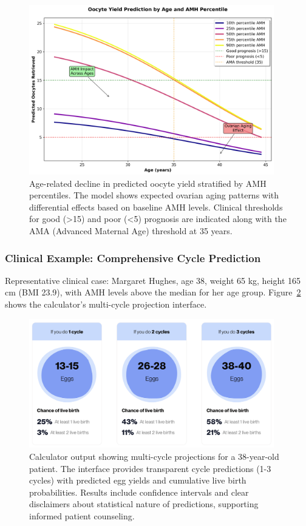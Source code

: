 \begin{figure}[H]
    \centering
    \includegraphics[width=0.95\textwidth]{figures/calculator_age_oocytes.png}
    \caption{Age-related decline in predicted oocyte yield stratified by AMH percentiles. The model shows expected ovarian aging patterns with differential effects based on baseline AMH levels. Clinical thresholds for good (>15) and poor (<5) prognosis are indicated along with the AMA (Advanced Maternal Age) threshold at 35 years.}
    \label{fig:calculator_age}
\end{figure}

\subsubsection{Clinical Example: Comprehensive Cycle Prediction}

Representative clinical case: Margaret Hughes, age 38, weight 65 kg, height 165 cm (BMI 23.9), with AMH levels above the median for her age group. Figure~\ref{fig:oocyte_prediction} shows the calculator's multi-cycle projection interface.

\begin{figure}[H]
    \centering
    \includegraphics[width=0.95\textwidth]{figures/OocytePrediction.png}
    \caption{Calculator output showing multi-cycle projections for a 38-year-old patient. The interface provides transparent cycle predictions (1-3 cycles) with predicted egg yields and cumulative live birth probabilities. Results include confidence intervals and clear disclaimers about statistical nature of predictions, supporting informed patient counseling.}
    \label{fig:oocyte_prediction}
\end{figure}

